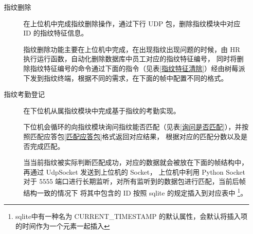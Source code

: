 \begin{description}
        \begin{table}[htbp]
            \caption{获取指纹特征命令用户层帧} \label{uart::upload-data}
        \end{table}

        \item[指纹删除] 在上位机中完成指纹删除操作，通过下行 UDP 包，删除指纹模块中对应 ID 的指纹特征信息。
        
        指纹删除功能主要在上位机中完成，在出现指纹出现问题的时候，由 HR 执行运行函数，自动化删除数据库中员工对应的指纹特征编号，
        同时将删除指纹特征编号的命令通过下面的指令（见表\ref{指纹特征清除}）经由树莓派下发到指纹终端，根据不同的需求，在下面的帧中配置不同的格式。

        \begin{table}[H]
            \caption{指纹特征清除} \label{指纹特征清除}
        \end{table}

        \item[指纹考勤登记] 在下位机从属指纹模块中完成基于指纹的考勤实现。
        
        下位机会循环的向指纹模块询问指纹能否匹配（见表\ref{询问是否匹配}），并按照匹配应答包\ref{匹配应答包}格式返回对应结果，
        根据对应的匹配分数以及是否完成匹配。

        当当前指纹被实际判断匹配成功，对应的数据就会被放在下面的帧结构中，再通过 UdpSocket 发送到上位机的 Socket，
        上位机中利用 Python Socket 对于 5555 端口进行长期监听，对所有监听到的数据包进行匹配，当前后帧结构一致的情况下
        将其中包含的 ID 按照 sqlite 的规定插入到对应表中
        \footnote{sqlite中有一种名为 CURRENT\_TIMESTAMP 的默认属性，会默认将插入项的时间作为一个元素一起插入}。


\end{description}

